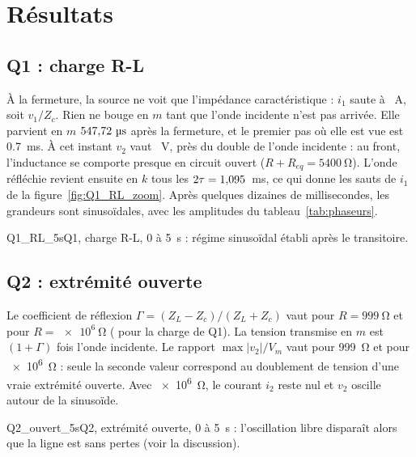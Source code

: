 \section{Résultats}

\subsection{Q1 : charge R-L}

À la fermeture, la source ne voit que l'impédance caractéristique : $i_1$ saute à \iunA~A,
soit $v_1/Z_c$. Rien ne bouge en $m$ tant que l'onde incidente n'est pas arrivée. Elle parvient
en $m$ $\tauL~\unit{\micro s}$ après la fermeture, et le premier pas où elle est vue est
\SI{0.7}{ms}. À cet instant $v_2$ vaut \vdeuxC~V, près du double de l'onde incidente :
au front, l'inductance se comporte presque en circuit ouvert ($R + R_{eq} = \SI{5400}{\ohm}$).
L'onde réfléchie revient ensuite en $k$ tous les $2\tau = 1{,}095$~ms, ce qui donne les
sauts de $i_1$ de la figure~\ref{fig:Q1_RL_zoom}. Après quelques dizaines de millisecondes, les
grandeurs sont sinusoïdales, avec les amplitudes du tableau~\ref{tab:phaseurs}.

{Q1_RL_5s}{Q1, charge R-L, 0 à 5~s : régime sinusoïdal établi après le transitoire.}

\subsection{Q2 : extrémité ouverte}

Le coefficient de réflexion $\Gamma = (Z_L - Z_c)/(Z_L + Z_c)$ vaut \Gneuf{} pour
$R = \SI{999}{\ohm}$ et \Gmega{} pour $R = \SI{e6}{\ohm}$ (\GRL{} pour la charge de Q1). La
tension transmise en $m$ est $(1+\Gamma)$ fois l'onde incidente. Le rapport $\max|v_2|/V_m$
vaut \rapNeuf{} pour 999~\unit{\ohm} et \rapMega{} pour \SI{e6}{\ohm} : seule la seconde valeur
correspond au doublement de tension d'une vraie extrémité ouverte. Avec \SI{e6}{\ohm}, le
courant $i_2$ reste nul et $v_2$ oscille autour de la sinusoïde.

{Q2_ouvert_5s}{Q2, extrémité ouverte, 0 à 5~s : l'oscillation libre disparaît alors que la
ligne est sans pertes (voir la discussion).}

